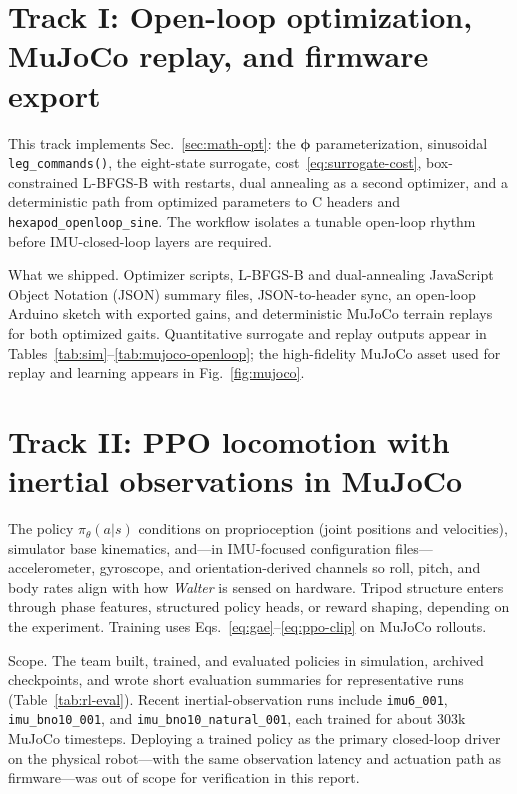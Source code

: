 \documentclass[11pt]{article}
\begin{document}
\section{Track I: Open-loop optimization, MuJoCo replay, and firmware export}
\label{sec:track1}

This track implements Sec.~\ref{sec:math-opt}: the $\boldsymbol{\phi}$ parameterization, sinusoidal \texttt{leg\_commands()}, the eight-state surrogate, cost~\eqref{eq:surrogate-cost}, box-constrained L-BFGS-B with restarts, dual annealing as a second optimizer, and a deterministic path from optimized parameters to C headers and \texttt{hexapod\_openloop\_sine}. The workflow isolates a tunable open-loop rhythm before IMU-closed-loop layers are required.

What we shipped. Optimizer scripts, L-BFGS-B and dual-annealing JavaScript Object Notation (JSON) summary files, JSON-to-header sync, an open-loop Arduino sketch with exported gains, and deterministic MuJoCo terrain replays for both optimized gaits. Quantitative surrogate and replay outputs appear in Tables~\ref{tab:sim}--\ref{tab:mujoco-openloop}; the high-fidelity MuJoCo asset used for replay and learning appears in Fig.~\ref{fig:mujoco}.

\section{Track II: PPO locomotion with inertial observations in MuJoCo}
\label{sec:track2}

The policy $\pi_\theta(a|s)$ conditions on proprioception (joint positions and velocities), simulator base kinematics, and---in IMU-focused configuration files---accelerometer, gyroscope, and orientation-derived channels so roll, pitch, and body rates align with how \emph{Walter} is sensed on hardware. Tripod structure enters through phase features, structured policy heads, or reward shaping, depending on the experiment. Training uses Eqs.~\eqref{eq:gae}--\eqref{eq:ppo-clip} on MuJoCo rollouts.

Scope. The team built, trained, and evaluated policies in simulation, archived checkpoints, and wrote short evaluation summaries for representative runs (Table~\ref{tab:rl-eval}). Recent inertial-observation runs include \texttt{imu6\_001}, \texttt{imu\_bno10\_001}, and \texttt{imu\_bno10\_natural\_001}, each trained for about 303k MuJoCo timesteps. Deploying a trained policy as the primary closed-loop driver on the physical robot---with the same observation latency and actuation path as firmware---was out of scope for verification in this report.
\end{document}
